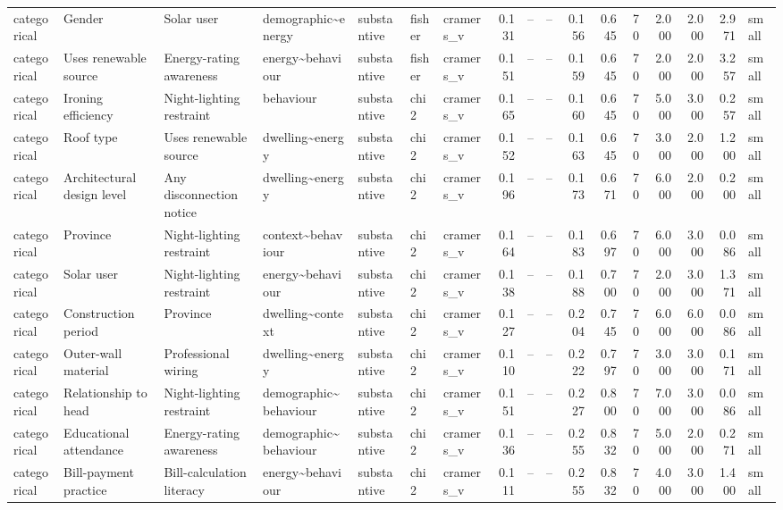 \begin{table}
\begin{tabular}{lllllllrrrrrrrrrl}
categorical & Gender & Solar user & demographic\textasciitilde energy & substantive & fisher & cramers\_v & 0.131 & -- & -- & 0.156 & 0.645 & 70 & 2.000 & 2.000 & 2.971 & small \\
categorical & Uses renewable source & Energy-rating awareness & energy\textasciitilde behaviour & substantive & fisher & cramers\_v & 0.151 & -- & -- & 0.159 & 0.645 & 70 & 2.000 & 2.000 & 3.257 & small \\
categorical & Ironing efficiency & Night-lighting restraint & behaviour & substantive & chi2 & cramers\_v & 0.165 & -- & -- & 0.160 & 0.645 & 70 & 5.000 & 3.000 & 0.257 & small \\
categorical & Roof type & Uses renewable source & dwelling\textasciitilde energy & substantive & chi2 & cramers\_v & 0.152 & -- & -- & 0.163 & 0.645 & 70 & 3.000 & 2.000 & 1.200 & small \\
categorical & Architectural design level & Any disconnection notice & dwelling\textasciitilde energy & substantive & chi2 & cramers\_v & 0.196 & -- & -- & 0.173 & 0.671 & 70 & 6.000 & 2.000 & 0.200 & small \\
categorical & Province & Night-lighting restraint & context\textasciitilde behaviour & substantive & chi2 & cramers\_v & 0.164 & -- & -- & 0.183 & 0.697 & 70 & 6.000 & 3.000 & 0.086 & small \\
categorical & Solar user & Night-lighting restraint & energy\textasciitilde behaviour & substantive & chi2 & cramers\_v & 0.138 & -- & -- & 0.188 & 0.700 & 70 & 2.000 & 3.000 & 1.371 & small \\
categorical & Construction period & Province & dwelling\textasciitilde context & substantive & chi2 & cramers\_v & 0.127 & -- & -- & 0.204 & 0.745 & 70 & 6.000 & 6.000 & 0.086 & small \\
categorical & Outer-wall material & Professional wiring & dwelling\textasciitilde energy & substantive & chi2 & cramers\_v & 0.110 & -- & -- & 0.222 & 0.797 & 70 & 3.000 & 3.000 & 0.171 & small \\
categorical & Relationship to head & Night-lighting restraint & demographic\textasciitilde behaviour & substantive & chi2 & cramers\_v & 0.151 & -- & -- & 0.227 & 0.800 & 70 & 7.000 & 3.000 & 0.086 & small \\
categorical & Educational attendance & Energy-rating awareness & demographic\textasciitilde behaviour & substantive & chi2 & cramers\_v & 0.136 & -- & -- & 0.255 & 0.832 & 70 & 5.000 & 2.000 & 0.271 & small \\
categorical & Bill-payment practice & Bill-calculation literacy & energy\textasciitilde behaviour & substantive & chi2 & cramers\_v & 0.111 & -- & -- & 0.255 & 0.832 & 70 & 4.000 & 3.000 & 1.400 & small \\

\end{tabular}
\end{table}
